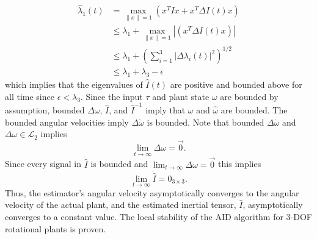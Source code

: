 %
\begin{align}
\hat{\lambda}_1(t)
 &= \max_{\|x\|=1}\left(x^T I x + x^T \Delta I(t) x\right)
\nonumber \\
 &\leq \lambda_1 +\max_{\|x\|=1}|\left(x^T \Delta I(t) x\right)|
\nonumber \\
  &\leq \lambda_1 +\left(\sum_{i=1}^3|\Delta\lambda_i(t)|^2\right)^{1/2}
\nonumber \\
  &\leq \lambda_1 +\lambda_3 -\epsilon
\end{align}
%
which implies that the eigenvalues of $\hat{I}(t)$ are
positive and bounded above for all time since $\epsilon<\lambda_3$. Since the 
input $\tau$ and plant state $\omega$ are bounded by assumption,
bounded $\Delta \omega$, $\hat{I}$, and $\hat{I}^{-1}$ imply that
$\dot{\omega}$ and $\dot{\hat{\omega}}$ are bounded.  The bounded
angular velocities imply $\Delta \dot{\omega}$ is bounded.  Note that
bounded $\Delta \dot{\omega}$ and $\Delta \omega \in \mathcal{L}_2$
implies
%
\begin{equation}
\lim_{t\to \infty}\Delta\omega=\vec{0}.
\end{equation}
%
Since every signal in $\dot{\hat{I}}$ is bounded and
$\lim_{t\to \infty}\Delta\omega=\vec{0}$ this implies
%
\begin{equation}
\lim_{t\to \infty}\dot{\hat{I}}=0_{3 \times 3}.
\end{equation}
%
Thus, the estimator's angular velocity asymptotically converges to the
angular velocity of the actual plant, and the estimated inertial
tensor, $\hat{I}$, asymptotically converges to a constant value. The
local stability of the \ac{AID} algorithm for 3-\ac{DOF} rotational
plants is proven.
